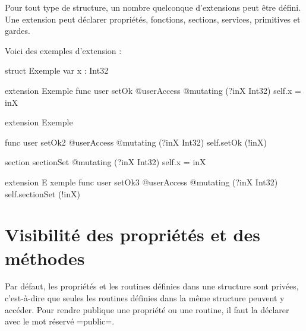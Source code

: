 Pour tout type de structure, un nombre quelconque d'extensions peut être défini. Une extension peut déclarer propriétés, fonctions, sections, services, primitives et gardes.

Voici des exemples d'extension :

\begin{OMNIBUS}
struct Exemple {
  var x : Int32
}

extension Exemple {
  func user setOk @userAccess @mutating (?inX Int32) {
    self.x = inX
  }
}

extension Exemple {
  func user setOk2 @userAccess @mutating (?inX Int32) {
    self.setOk (!inX)
  }

  section sectionSet @mutating (?inX Int32) {
    self.x = inX
  }
}

extension E xemple {
  func user setOk3 @userAccess @mutating (?inX Int32) {
    self.sectionSet (!inX)
  }
}
\end{OMNIBUS}






\section{Visibilité des propriétés et des méthodes}

Par défaut, les propriétés et les routines définies dans une structure sont privées, c'est-à-dire que seules les routines définies dans la même structure peuvent y accéder. Pour rendre publique une propriété ou une routine, il faut la déclarer avec le mot réservé \omnibus=public=.


